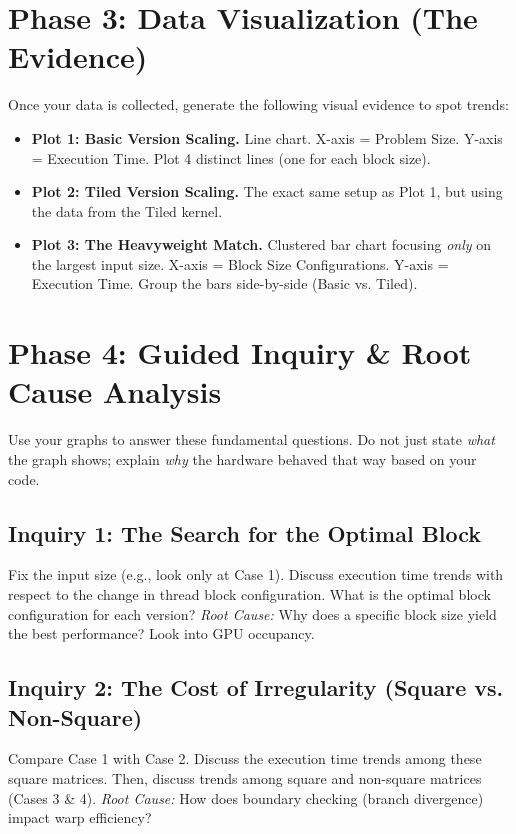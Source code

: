 \documentclass{article}
\begin{document}
\section*{Phase 3: Data Visualization (The Evidence)}
Once your data is collected, generate the following visual evidence to spot trends:

\begin{itemize}
    \item \textbf{Plot 1: Basic Version Scaling.} Line chart. X-axis = Problem Size. Y-axis = Execution Time. Plot 4 distinct lines (one for each block size).
    \item \textbf{Plot 2: Tiled Version Scaling.} The exact same setup as Plot 1, but using the data from the Tiled kernel.
    \item \textbf{Plot 3: The Heavyweight Match.} Clustered bar chart focusing \textit{only} on the largest input size. X-axis = Block Size Configurations. Y-axis = Execution Time. Group the bars side-by-side (Basic vs. Tiled).
\end{itemize}

\section*{Phase 4: Guided Inquiry \& Root Cause Analysis}
Use your graphs to answer these fundamental questions. Do not just state \textit{what} the graph shows; explain \textit{why} the hardware behaved that way based on your code.

\subsection*{Inquiry 1: The Search for the Optimal Block}
Fix the input size (e.g., look only at Case 1). Discuss execution time trends with respect to the change in thread block configuration. What is the optimal block configuration for each version? \textit{Root Cause:} Why does a specific block size yield the best performance? Look into GPU occupancy.

\subsection*{Inquiry 2: The Cost of Irregularity (Square vs. Non-Square)}
Compare Case 1 with Case 2. Discuss the execution time trends among these square matrices. Then, discuss trends among square and non-square matrices (Cases 3 \& 4). \textit{Root Cause:} How does boundary checking (branch divergence) impact warp efficiency? 
\end{document}
